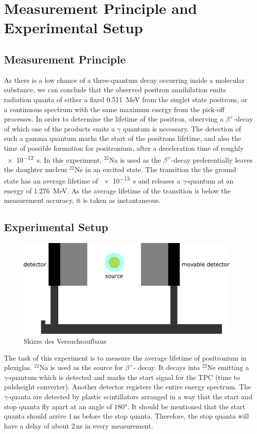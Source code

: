 \chapter{Measurement Principle and Experimental Setup}
\section{Measurement Principle}
As there is a low chance of a three-quantum decay occurring inside a molecular substance, we can conclude that the observed positron annihilation  emits radiation quanta of either a fixed \SI{0.511}{MeV} from the singlet state positrons, or a continuous spectrum with the same maximum energy from the pick-off processes.
In order to determine the lifetime of the positron, observing a $\beta^+$-decay of which one of the products emits a $\gamma$ quantum is necessary. The detection of such a gamma quantum marks the start of the positrons lifetime, and also the time of possible formation for positronium, after a deceleration time of roughly   
\SI{e-12}{s}. In this experiment, $^{22}$Na is used
as the $\beta^+$-decay preferentially leaves the daughter nucleus $^22$Ne in an excited state. The transition the the ground state has an average lifetime of \SI{e-13}{s} and releases a $\gamma$-quantum at an energy of \SI{1.276}{MeV}. As the average lifetime of the transition is below the measurement accuracy, it is taken as instantaneous. 

\section{Experimental Setup}

\begin{figure}[H]
    \centering
    \includegraphics[width=110mm,scale=0.5]{Positronium/include/positronium.png}
    \caption{Skizze des Versuchsaufbaus} 
    \label{fig:Versuchsaufbau}
\end{figure}

The task of this experiment is to measure the average lifetime of positronium in plexiglas. $^{22}$Na is used as the source for $\beta ^{+}$- decay. It decays into $^{22}$Ne emitting a $\gamma$-quantum which is detected and marks the start signal for the TPC (time to pulsheight converter). Another detector registers the entire energy spectrum. The $\gamma$-quanta are detected by plastic scintillators arranged in a way that the start and stop quanta fly apart at an angle of $180$°. It should be mentioned that the start quanta should arrive $1\,$ns before the stop quanta. Therefore, the stop quanta will have a delay of about $2$\,ns in every measurement.